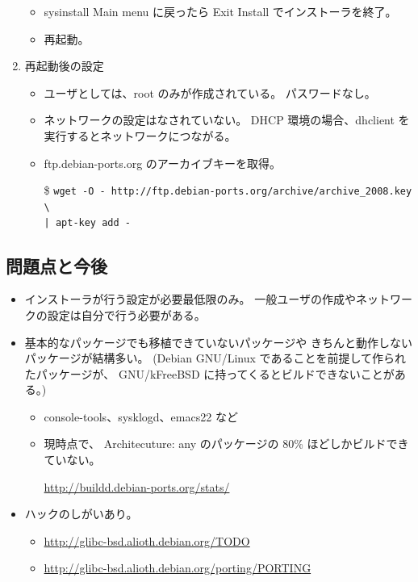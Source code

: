 \documentclass[mingoth,a4paper]{jsarticle}
\begin{document}
\begin{enumerate}
\begin{itemize}
  \item sysinstall Main menu に戻ったら Exit Install でインストーラを終了。
  \item 再起動。
  \end{itemize}
\item 再起動後の設定
  \begin{itemize}
  \item ユーザとしては、root のみが作成されている。
    パスワードなし。
  \item ネットワークの設定はなされていない。
    DHCP 環境の場合、dhclient を実行するとネットワークにつながる。
  \item ftp.debian-ports.org のアーカイブキーを取得。

    \$ \verb+wget -O - http://ftp.debian-ports.org/archive/archive_2008.key \+ \\
    \verb+| apt-key add -+
  \end{itemize}
\end{enumerate}

\subsection{問題点と今後}

\begin{itemize}
\item インストーラが行う設定が必要最低限のみ。
  一般ユーザの作成やネットワークの設定は自分で行う必要がある。
\item 基本的なパッケージでも移植できていないパッケージや
  きちんと動作しないパッケージが結構多い。
  (Debian GNU/Linux であることを前提して作られたパッケージが、
  GNU/kFreeBSD に持ってくるとビルドできないことがある。)
  \begin{itemize}
  \item console-tools、sysklogd、emacs22 など
  \item 現時点で、
    Architecuture: any のパッケージの 80\% ほどしかビルドできていない。

    \url{http://buildd.debian-ports.org/stats/}
  \end{itemize}
\item ハックのしがいあり。
  \begin{itemize}
  \item \url{http://glibc-bsd.alioth.debian.org/TODO}
  \item \url{http://glibc-bsd.alioth.debian.org/porting/PORTING}
  \end{itemize}
\end{itemize}
\end{document}
